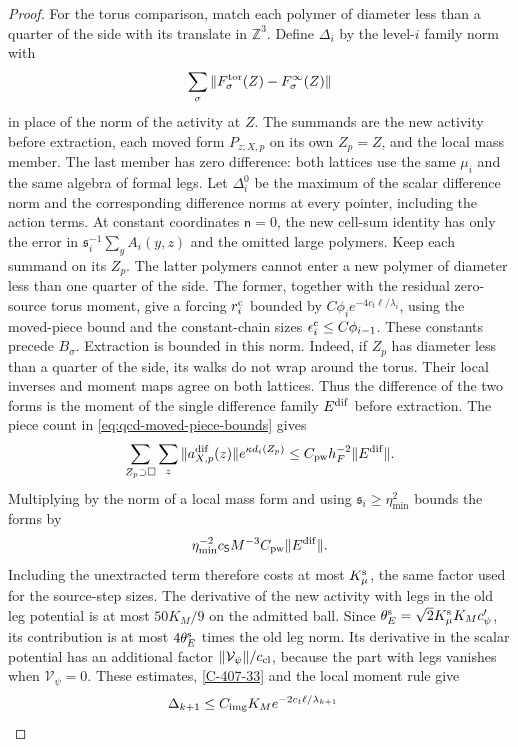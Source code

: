 \documentclass[11pt,letterpaper,reqno]{amsart}
\theoremstyle{definition}
\theoremstyle{remark}
\begin{document}
\begin{proof}
For the torus comparison, match each polymer of diameter less
than a quarter of the side with its translate in $\mathbb Z^3$.
Define $\Delta_i$ by the level-$i$ family norm with
\[
 \sum_\sigma\|F^{\rm tor}_\sigma(Z)-F^\infty_\sigma(Z)\|
\]
in place of the norm of the activity at $Z$. The summands are
the new activity before extraction, each moved form $P_{z;X,p}$
on its own $Z_p=Z$, and the local mass member. The last member
has zero difference: both lattices use the same $\mu_i$ and
the same algebra of formal legs. Let $\Delta_i^0$ be the maximum
of the scalar difference norm and the corresponding difference
norms at every pointer, including the action terms. At constant
coordinates $\mathsf n=0$, the new cell-sum identity has
only the error in $\mathfrak s_i^{-1}\sum_y A_i(y,z)$ and
the omitted large polymers. Keep each summand on its $Z_p$.
The latter polymers cannot enter a new polymer of diameter
less than one quarter of the side. The former, together
with the residual zero-source torus moment, give a forcing
$r_i^{\rm c}$ bounded by
$C\phi_i e^{-4c_t\ell/\lambda_i}$, using the moved-piece
bound and the constant-chain sizes $\epsilon_i^{\rm c}
\le C\phi_{i-1}$. These constants precede $B_\sigma$.
Extraction is bounded in this norm. Indeed, if $Z_p$ has
diameter less than a quarter of the side, its walks do not
wrap around the torus. Their local inverses and moment maps
agree on both lattices. Thus the difference of the two forms
is the moment of the single difference family $E^{\rm dif}$
before extraction. The piece count in
\cref{eq:qcd-moved-piece-bounds} gives
\[
 \sum_{Z_p\supset\square}\sum_z
     \|a^{\rm dif}_{X,p}(z)\|e^{\kappa d_i(Z_p)}
       \le C_{\rm pw}h_F^{-2}\|E^{\rm dif}\|.
\]
Multiplying by the norm of a local mass form and using
$\mathfrak s_i\ge\eta_{\min}^2$ bounds the forms by
\[
 \eta_{\min}^{-2}c_{\mathsf S}M^{-3}C_{\rm pw}
 \|E^{\rm dif}\|.
\]
Including the unextracted term therefore
costs at most $K_\mu^{\rm s}$, the same factor used for the
source-step sizes. The derivative of the new activity with
legs in the old leg potential is at most $50K_M/9$ on the
admitted ball. Since
$\theta_E^{\rm s}=\sqrt2K_\mu^{\rm s}K_Mc'_\psi$,
its contribution is at most $4\theta_E^{\rm s}$ times the
old leg norm. Its derivative in the scalar potential has
an additional factor $\|\mathcal V_\psi\|/c_{\rm cl}$,
because the part with legs vanishes when $\mathcal V_\psi=0$.
These estimates, \cref{C-407-33} and the local moment rule give
\[
\begin{split}
 \Delta_{k+1}\le{}&C_{\rm img}K_Me^{-2c_t\ell/\lambda_{k+1}}

\end{split}\]
\end{proof}
\end{document}
